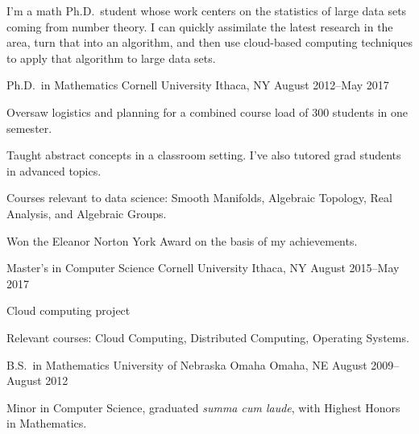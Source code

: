 \documentclass[11pt, letterpaper]{awesome-cv}
\begin{document}
\makecvheader





\begin{cvparagraph}

I'm a math Ph.D.~student whose work centers on the statistics of large data sets coming from number theory. I can quickly assimilate the latest research in the area, turn that into an algorithm, and then use cloud-based computing techniques to apply that algorithm to large data sets. 
\end{cvparagraph}






\begin{cventries}

\cventry
	{Ph.D.~in Mathematics}
	{Cornell University}
	{Ithaca, NY}
	{August 2012--May 2017}
	{
		\begin{cvitems}
			\item{Oversaw logistics and planning for a combined course load of 300 students in one semester.}
			\item{Taught abstract concepts in a classroom setting. I've also tutored grad students in advanced topics.}
			\item{Courses relevant to data science: Smooth Manifolds, Algebraic Topology, Real Analysis, and Algebraic Groups.}
			\item{Won the Eleanor Norton York Award on the basis of my achievements.}
		\end{cvitems}
	}
	
\cventry
	{Master's in Computer Science}
	{Cornell University}
	{Ithaca, NY}
	{August 2015--May 2017}
	{
		\begin{cvitems}
			\item{Cloud computing project}
			\item{Relevant courses: Cloud Computing, Distributed Computing, Operating Systems.}
		\end{cvitems}
	}
	
\cventry
	{B.S.~in Mathematics}
	{University of Nebraska Omaha}
	{Omaha, NE}
	{August 2009--August 2012}
	{
		\begin{cvitems}
			\item{Minor in Computer Science, graduated \emph{summa cum laude}, with Highest Honors in Mathematics.}
		\end{cvitems}
	}
	
\end{cventries}
\end{document}
